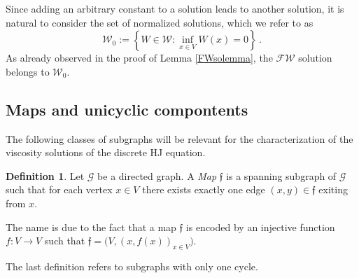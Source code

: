 \documentclass[reqno]{amsart}
\theoremstyle{plain}
\theoremstyle{definition}
\newtheorem{definition}[theorem]{Definition}
\theoremstyle{remark}
\numberwithin{equation}{section}
\numberwithin{theorem}{section}
\newcommand{\<}{\langle}
\renewcommand{\>}{\rangle}
\begin{document}
Since adding an arbitrary constant to a solution leads to another solution, it is natural to consider the set of normalized solutions, which we refer to as
\begin{equation}
	\mathcal{W}_0:=\left\{W\in \mathcal W : \inf_{x\in V}W(x)=0\right\}\,.
\end{equation}
As already observed in the proof of Lemma \ref{FWsolemma}, the $\mathscr{FW}$ solution belongs to $\mathcal W_0$.\\
\medskip



\subsection{Maps and unicyclic compontents}

The following  classes of subgraphs will be relevant for the characterization of the viscosity solutions of the discrete HJ equation.

\begin{definition}\label{def-dir-cy}
	Let $\mathcal G$ be a directed graph. A \emph{Map} $\mathfrak f$ is a spanning subgraph of $\mathcal G$ such that for each vertex $x\in V$ there exists exactly one edge $(x,y)\in \mathfrak f$ exiting from $x$.
\end{definition}
The name is due to the fact that a map $\mathfrak f$ is encoded by an injective function $f:V\to V$ such that $\mathfrak f=\Big(V,(x,f(x))_{x\in V}\Big)$.

\smallskip

The last definition refers to subgraphs with only one cycle.
\end{document}
